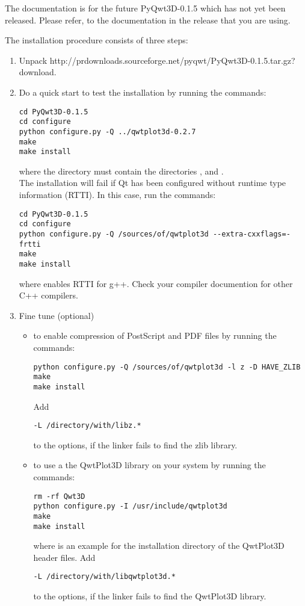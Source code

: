 \documentclass{manual}
\newcommand{\PyQwtDddTarGz}{\ulink{PyQwt3D-0.1.5.tar.gz}
  {http://prdownloads.sourceforge.net/pyqwt/PyQwt3D-0.1.5.tar.gz?download}}
\newcommand{\Future}{
  \begin{notice}[warning]
    The documentation is for the future PyQwt3D-0.1.5 which has not yet been
    released.  Please refer, to the documentation in the release that you are
    using.
  \end{notice}
}
\begin{document}
\Future{}

The installation procedure consists of three steps:
\begin{enumerate}
\item
  Unpack \PyQwtDddTarGz{}.
\item
  Do a quick start to test the installation by running the commands:
\begin{verbatim}
cd PyQwt3D-0.1.5
cd configure
python configure.py -Q ../qwtplot3d-0.2.7
make
make install
\end{verbatim}
  where the directory
   must contain the directories ,
   and .\\
  The installation will fail if Qt has been configured without runtime type
  information (RTTI).  In this case, run the commands:
\begin{verbatim}
cd PyQwt3D-0.1.5
cd configure
python configure.py -Q /sources/of/qwtplot3d --extra-cxxflags=-frtti
make
make install
\end{verbatim}
  where  enables RTTI for g++.  Check your compiler documention
  for other C++ compilers.
\item
  Fine tune (optional)
  \begin{itemize}
    \item
      to enable compression of PostScript and PDF files by running the
      commands:
\begin{verbatim}
python configure.py -Q /sources/of/qwtplot3d -l z -D HAVE_ZLIB
make
make install
\end{verbatim}
      Add
\begin{verbatim}
-L /directory/with/libz.*
\end{verbatim}
      to the  options, if the linker fails to find the zlib
      library.
    \item
      to use a the QwtPlot3D library on your system by running the commands:
\begin{verbatim}
rm -rf Qwt3D
python configure.py -I /usr/include/qwtplot3d
make
make install
\end{verbatim}
      where  is an example for the installation
      directory of the QwtPlot3D header files.
      Add
\begin{verbatim}
-L /directory/with/libqwtplot3d.*
\end{verbatim}
      to the  options, if the linker fails to find the
      QwtPlot3D library.
  \end{itemize}
\end{enumerate}
\end{document}
